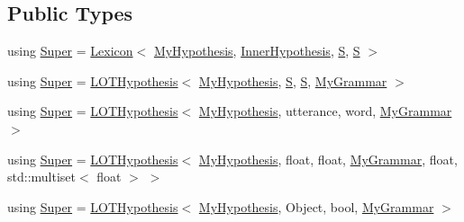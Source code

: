 \subsection*{Public Types}
\begin{DoxyCompactItemize}
\item 
using \hyperlink{class_my_hypothesis_a266742f266abc638ddc1d1870d735313}{Super} = \hyperlink{class_lexicon}{Lexicon}$<$ \hyperlink{class_my_hypothesis}{My\+Hypothesis}, \hyperlink{class_inner_hypothesis}{Inner\+Hypothesis}, \hyperlink{_formal_language_theory-_complex_2_main_8cpp_a51c40915539205f0b5add30b0d68a4cb}{S}, \hyperlink{_formal_language_theory-_complex_2_main_8cpp_a51c40915539205f0b5add30b0d68a4cb}{S} $>$
\item 
using \hyperlink{class_my_hypothesis_ae5fab2ea7ef7729968ac60a2ce267168}{Super} = \hyperlink{class_l_o_t_hypothesis}{L\+O\+T\+Hypothesis}$<$ \hyperlink{class_my_hypothesis}{My\+Hypothesis}, \hyperlink{_formal_language_theory-_complex_2_main_8cpp_a51c40915539205f0b5add30b0d68a4cb}{S}, \hyperlink{_formal_language_theory-_complex_2_main_8cpp_a51c40915539205f0b5add30b0d68a4cb}{S}, \hyperlink{class_my_grammar}{My\+Grammar} $>$
\item 
using \hyperlink{class_my_hypothesis_a1c1cfa95f1a49b273f8a93b3246342e6}{Super} = \hyperlink{class_l_o_t_hypothesis}{L\+O\+T\+Hypothesis}$<$ \hyperlink{class_my_hypothesis}{My\+Hypothesis}, utterance, word, \hyperlink{class_my_grammar}{My\+Grammar} $>$
\item 
using \hyperlink{class_my_hypothesis_aebf7eaf0477f8b39639e917bc87d208f}{Super} = \hyperlink{class_l_o_t_hypothesis}{L\+O\+T\+Hypothesis}$<$ \hyperlink{class_my_hypothesis}{My\+Hypothesis}, float, float, \hyperlink{class_my_grammar}{My\+Grammar}, float, std\+::multiset$<$ float $>$ $>$
\item 
using \hyperlink{class_my_hypothesis_af34a1c11e5b0aae4a52b54bfdd7a0617}{Super} = \hyperlink{class_l_o_t_hypothesis}{L\+O\+T\+Hypothesis}$<$ \hyperlink{class_my_hypothesis}{My\+Hypothesis}, Object, bool, \hyperlink{class_my_grammar}{My\+Grammar} $>$
\end{DoxyCompactItemize}
